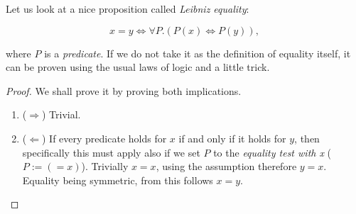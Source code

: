 \documentclass{article}
\title{}
\author{Adam Fiedler}
\begin{document}
\maketitle

Let us look at a nice proposition called \textit{Leibniz equality}:

\[ x = y \iff \forall P . (P(x) \iff P(y)), \]

\noindent where $P$ is a \emph{predicate}. If we do not take it as the definition of equality itself, it can be proven using the usual laws of logic and a little trick.

\begin{proof}
We shall prove it by proving both implications.
\begin{enumerate}
  \item ($\Rightarrow$) Trivial.
  \item ($\Leftarrow$) If every predicate holds for $x$ if and only if it holds for $y$, then specifically this must apply also if we set $P$ to the \emph{equality test with x} ($P := (= x)$). Trivially $x = x$, using the assumption therefore $y = x$. Equality being symmetric, from this follows $x = y$.
\end{enumerate}

\end{proof}
\end{document}
